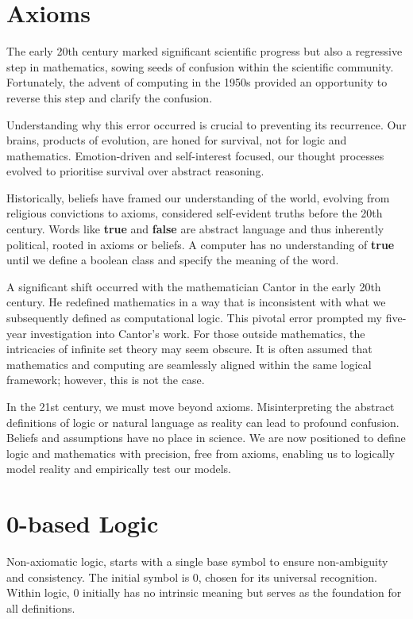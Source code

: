 \documentclass{article}
\begin{document}
\section*{Axioms}

The early 20th century marked significant scientific progress but also a regressive step in mathematics, sowing seeds of confusion within the scientific community. Fortunately, the advent of computing in the 1950s provided an opportunity to reverse this step and clarify the confusion.

Understanding why this error occurred is crucial to preventing its recurrence. Our brains, products of evolution, are honed for survival, not for logic and mathematics. Emotion-driven and self-interest focused, our thought processes evolved to prioritise survival over abstract reasoning.

Historically, beliefs have framed our understanding of the world, evolving from religious convictions to axioms, considered self-evident truths before the 20th century. Words like \textbf{true} and \textbf{false} are abstract language and thus inherently political, rooted in axioms or beliefs. A computer has no understanding of \textbf{true} until we define a boolean class and specify the meaning of the word.

A significant shift occurred with the mathematician Cantor in the early 20th century. He redefined mathematics in a way that is inconsistent with what we subsequently defined as computational logic. This pivotal error prompted my five-year investigation into Cantor’s work. For those outside mathematics, the intricacies of infinite set theory may seem obscure. It is often assumed that mathematics and computing are seamlessly aligned within the same logical framework; however, this is not the case.

In the 21st century, we must move beyond axioms. Misinterpreting the abstract definitions of logic or natural language as reality can lead to profound confusion. Beliefs and assumptions have no place in science. We are now positioned to define logic and mathematics with precision, free from axioms, enabling us to logically model reality and empirically test our models.

\section*{0-based Logic}

Non-axiomatic logic, starts with a single base symbol to ensure non-ambiguity and consistency. The initial symbol is 0, chosen for its universal recognition. Within logic, 0 initially has no intrinsic meaning but serves as the foundation for all definitions.
\end{document}
